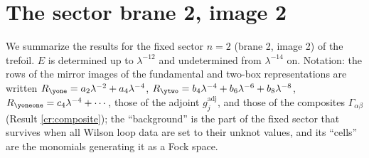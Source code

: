 \section{The sector brane 2, image 2}\label{app:n2}
We summarize the results for the fixed sector $n = 2$ (brane 2, image 2) of the trefoil. $E$ is determined up to $\lambda^{-12}$ and undetermined from $\lambda^{-14}$ on. Notation: the rows of the mirror images of the fundamental and two-box representations are written $R_{\yone} = a_2\lambda^{-2} + a_4\lambda^{-4}$, $R_{\ytwo} = b_4\lambda^{-4} + b_6\lambda^{-6} + b_8\lambda^{-8}$, $R_{\yoneone} = c_4\lambda^{-4} + \cdots$, those of the adjoint $g^{\mathrm{adj}}_j$, and those of the composites $\Gamma_{\alpha\beta}$ (Result \ref{cr:composite}); the ``background'' is the part of the fixed sector that survives when all Wilson loop data are set to their unknot values, and its ``cells'' are the monomials generating it as a Fock space.
